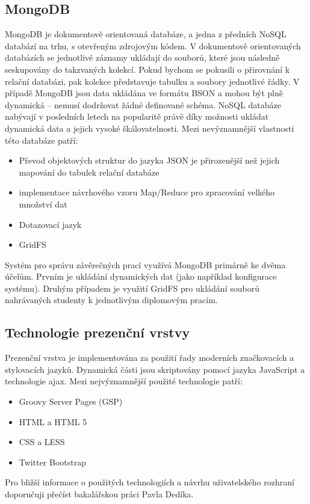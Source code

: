 \subsection{MongoDB}
MongoDB je dokumentově orientovaná databáze, a jedna z předních NoSQL databází na trhu, s otevřeným zdrojovým kódem. V dokumentově orientovaných databázích se jednotlivé záznamy ukládají do souborů, které jsou následně seskupovány do takzvaných kolekcí. Pokud bychom se pokusili o přirovnání k relační databázi, pak kolekce představuje tabulku a soubory jednotlivé řádky. V případě MongoDB jsou data ukládána ve formátu BSON a mohou být plně dynamická -- nemusí dodržovat žádné definované schéma. NoSQL databáze nabývají v posledních letech na popularitě právě díky možnosti ukládat dynamická data a jejich vysoké škálovatelnosti. Mezi nevýznamnější vlastnosti této databáze patří:

\begin{itemize}
\item Převod objektových struktur do jazyka JSON je přirozenější než jejich mapování do tabulek relační databáze
\item implementace návrhového vzoru Map/Reduce pro zpracování velkého množství dat
\item Dotazovací jazyk
\item GridFS
\end{itemize}

Systém pro správu závěrečných prací využívá MongoDB primárně ke dvěma účelům. Prvním je ukládání dynamických dat (jako například konfigurace systému). Druhým případem je využití GridFS pro ukládání souborů nahrávaných studenty k jednotlivým diplomovým pracím.


\subsection{Technologie prezenční vrstvy}
Prezenční vrstva je implementována za použití řady moderních značkovacích a stylovacích jazyků. Dynamická části jsou skriptovány pomocí jazyka JavaScript a technologie ajax. Mezi nejvýznamnější použité technologie patří:

\begin{itemize}
\item  Groovy Server Pages (GSP)
\item HTML a HTML 5
\item  CSS a LESS
\item Twitter Bootstrap
\end{itemize}

Pro bližší informace o použitých technologiích a návrhu uživatelského rozhraní doporučuji přečíst bakalářskou práci Pavla Dedíka.
